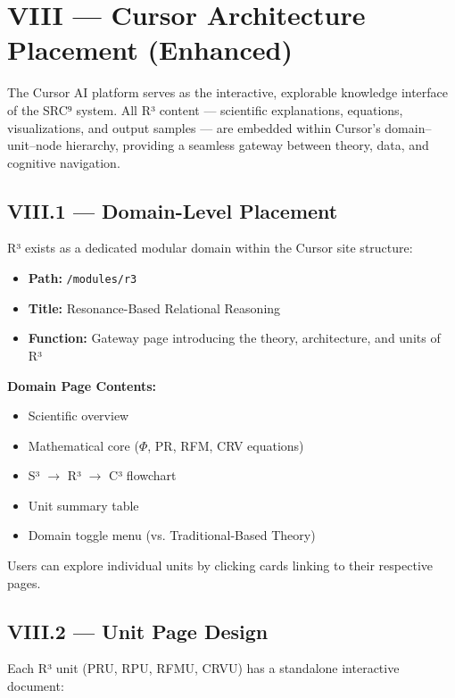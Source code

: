 \documentclass{article}
\begin{document}
\section*{VIII — Cursor Architecture Placement (Enhanced)}

The Cursor AI platform serves as the interactive, explorable knowledge interface of the SRC⁹ system. All R³ content — scientific explanations, equations, visualizations, and output samples — are embedded within Cursor's domain–unit–node hierarchy, providing a seamless gateway between theory, data, and cognitive navigation.

\subsection*{VIII.1 — Domain-Level Placement}

R³ exists as a dedicated modular domain within the Cursor site structure:

\begin{itemize}
    \item \textbf{Path:} \texttt{/modules/r3}
    \item \textbf{Title:} Resonance-Based Relational Reasoning
    \item \textbf{Function:} Gateway page introducing the theory, architecture, and units of R³
\end{itemize}

\textbf{Domain Page Contents:}

\begin{itemize}
    \item Scientific overview
    \item Mathematical core ($\Phi$, PR, RFM, CRV equations)
    \item S³ $\rightarrow$ R³ $\rightarrow$ C³ flowchart
    \item Unit summary table
    \item Domain toggle menu (vs. Traditional-Based Theory)
\end{itemize}

Users can explore individual units by clicking cards linking to their respective pages.

\subsection*{VIII.2 — Unit Page Design}

Each R³ unit (PRU, RPU, RFMU, CRVU) has a standalone interactive document:
\end{document}
